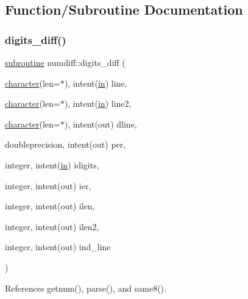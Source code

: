 \subsection{Function/\+Subroutine Documentation}
\mbox{\label{numdiff_8f90_a52df4f6514ae8b40384687c5e7a94445}} 
\subsubsection{\texorpdfstring{digits\+\_\+diff()}{digits\_diff()}}
{\footnotesize\ttfamily \hyperlink{M__stopwatch_83_8txt_acfbcff50169d691ff02d4a123ed70482}{subroutine} numdiff\+::digits\+\_\+diff (\begin{DoxyParamCaption}\item[{\hyperlink{option__stopwatch_83_8txt_abd4b21fbbd175834027b5224bfe97e66}{character}(len=$\ast$), intent(\hyperlink{M__journal_83_8txt_afce72651d1eed785a2132bee863b2f38}{in})}]{line,  }\item[{\hyperlink{option__stopwatch_83_8txt_abd4b21fbbd175834027b5224bfe97e66}{character}(len=$\ast$), intent(\hyperlink{M__journal_83_8txt_afce72651d1eed785a2132bee863b2f38}{in})}]{line2,  }\item[{\hyperlink{option__stopwatch_83_8txt_abd4b21fbbd175834027b5224bfe97e66}{character}(len=$\ast$), intent(out)}]{dline,  }\item[{doubleprecision, intent(out)}]{per,  }\item[{integer, intent(\hyperlink{M__journal_83_8txt_afce72651d1eed785a2132bee863b2f38}{in})}]{idigits,  }\item[{integer, intent(out)}]{ier,  }\item[{integer, intent(out)}]{ilen,  }\item[{integer, intent(out)}]{ilen2,  }\item[{integer, intent(out)}]{ind\+\_\+line }\end{DoxyParamCaption})}



References getnum(), parse(), and same8().

\mbox{\label{numdiff_8f90_aaeae7de323a14e4d927224585b530d90}} 
